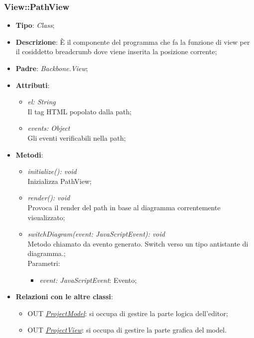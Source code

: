 \documentclass[../DefinizioneDiProdotto.tex]{subfiles}
\begin{document}
				\subsubsection{View::PathView}
					\hypertarget{SWEDesigner::Client::View::PathView}{}
					\begin{itemize}
						\item \textbf{Tipo}: \emph{Class};
						\item \textbf{Descrizione}: È il componente del programma che fa la funzione di view per il cosiddetto breadcrumb dove viene inserita la posizione corrente;
						\item \textbf{Padre}: \emph{Backbone.View};
						\item \textbf{Attributi}:
						\begin{itemize}
							\item \emph{el: String} \\
							Il tag HTML popolato dalla path;
							\item \emph{events: Object} \\
							Gli eventi verificabili nella path;
						\end{itemize}
						\item \textbf{Metodi}:
						\begin{itemize}
							\item \emph{initialize(): void} \\
							Inizializza PathView; 
							\item \emph{render(): void} \\
							Provoca il render del path in base al diagramma correntemente visualizzato; 
							\item \emph{switchDiagram(event: JavaScriptEvent): void} \\
							Metodo chiamato da evento generato. Switch verso un tipo antistante di diagramma.; \\
							Parametri:
							\begin{itemize}
								\item \emph{event: JavaScriptEvent}: Evento;
							\end{itemize}
						\end{itemize}
						\item \textbf{Relazioni con le altre classi}:
						\begin{itemize}
							\item OUT \hyperlink{SWEDesigner::Model::ProjectModel}{\emph{ProjectModel}}: si occupa di gestire la parte logica dell'editor;
							\item OUT \hyperlink{SWEDesigner::View::ProjectView}{\emph{ProjectView}}: si occupa di gestire la parte grafica del model.
						\end{itemize}
					\end{itemize}
\end{document}
